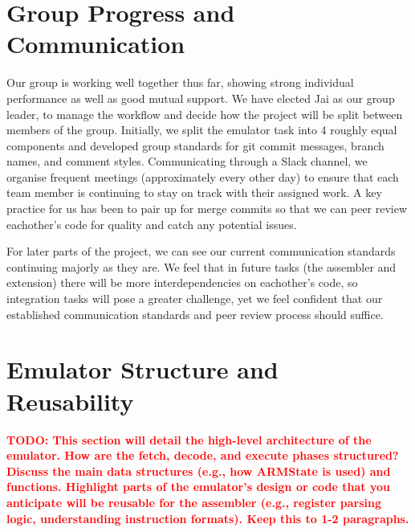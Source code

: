 \documentclass[11pt,a4paper]{article} %
\newcommand{\todo}[1]{\textcolor{red}{\textbf{TODO: #1}}}
\begin{document}
\section{Group Progress and Communication}
\label{sec:group-progress}

Our group is working well together thus far, showing strong individual performance as well as good mutual support. We have elected Jai as our group leader, to manage the workflow and decide how the project will be split between members of the group. Initially, we split the emulator task into 4 roughly equal components and developed group standards for git commit messages, branch names, and comment styles. Communicating through a Slack channel, we organise frequent meetings (approximately every other day) to ensure that each team member is continuing to stay on track with their assigned work. A key practice for us has been to pair up for merge commits so that we can peer review eachother’s code for quality and catch any potential issues. 

For later parts of the project, we can see our current communication standards continuing majorly as they are. We feel that in future tasks (the assembler and extension) there will be more interdependencies on eachother’s code, so integration tasks will pose a greater challenge, yet we feel confident that our established communication standards and peer review process should suffice.

\section{Emulator Structure and Reusability}
\label{sec:emulator-structure}
\todo{This section will detail the high-level architecture of the emulator. How are the fetch, decode, and execute phases structured? Discuss the main data structures (e.g., how ARMState is used) and functions. Highlight parts of the emulator's design or code that you anticipate will be reusable for the assembler (e.g., register parsing logic, understanding instruction formats). Keep this to 1-2 paragraphs.}
\end{document}

